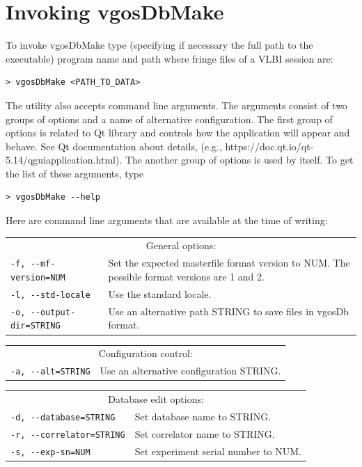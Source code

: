 \documentclass [10pt,letterpaper]{report}
\begin{document}
\chapter{Invoking vgosDbMake}
\label{chapter_invokation}
To invoke vgosDbMake type (specifying if necessary the full path
to the executable) program name and path where fringe files of a VLBI session are:
\begin{verbatim}
> vgosDbMake <PATH_TO_DATA>
\end{verbatim}
\noindent
The utility also accepts command line arguments. The arguments consist of
two groups of options and a name of alternative configuration. The first
group of options is related to Qt library and controls how the application
will appear and behave. See Qt documentation about details, (e.g.,
https://doc.qt.io/qt-5.14/qguiapplication.html).
The another group of options is used by itself. To get the list
of these arguments, type
\begin{verbatim}
> vgosDbMake --help
\end{verbatim}
\noindent
Here are command line arguments that are available at the time of writing:
\vspace{5mm}

\begin{tabular}{p{\leftSp}p{\riteSp}}
\multicolumn{2}{c}{General options:}\\

{\tt -f, -{}-mf-version=NUM}    & Set the expected masterfile format version to NUM. The possible format versions are 1 and 2.\\
{\tt -l, -{}-std-locale}        & Use the standard locale.\\
{\tt -o, -{}-output-dir=STRING} & Use an alternative path STRING to save files in vgosDb format.\\
\end{tabular}
\vspace{5mm}

\begin{tabular}{p{\leftSp}p{\riteSp}}
\multicolumn{2}{c}{Configuration control:}\\
{\tt -a, -{}-alt=STRING}        & Use an alternative configuration STRING.\\
\end{tabular}
\vspace{5mm}

\begin{tabular}{p{\leftSp}p{\riteSp}}
\multicolumn{2}{c}{Database edit options:}\\
{\tt -d, -{}-database=STRING}   & Set database name to STRING.\\
{\tt -r, -{}-correlator=STRING} & Set correlator name to STRING.\\
{\tt -s, -{}-exp-sn=NUM}        & Set experiment serial number to NUM.\\
\end{tabular}
\vspace{5mm}
\end{document}
